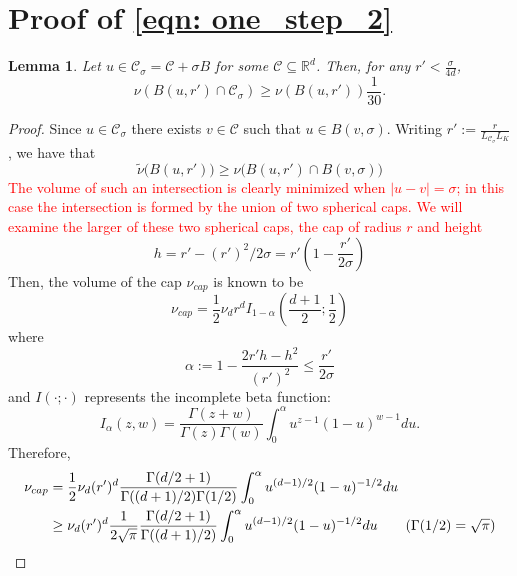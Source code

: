 \documentclass{article}
\newcommand{\Reals}{\mathbb{R}}
\newcommand{\abs}[1]{\left \lvert #1 \right \rvert}
\newcommand{\Cset}{\mathcal{C}}
\newcommand{\Csig}{\Cset_{\sigma}}
\newcommand{\1}{\mathbf{1}}
\theoremstyle{alden}
\theoremstyle{aldenthm}
\newtheorem{lemma}{Lemma}
\theoremstyle{remark}
\begin{document}
\section{Proof of \eqref{eqn: one_step_2}}
\begin{lemma}
	\label{lem: local_conductance}
	Let $u \in \Csig = \Cset + \sigma B$ for some $\Cset \subseteq \Reals^d$. Then, for any $r' < \frac{\sigma}{4d}$,
	\begin{equation*}
	\nu(B(u,r') \cap \Csig) \geq \nu(B(u,r'))\frac{1}{30}.
	\end{equation*}
\end{lemma}
\begin{proof}
	Since $u \in \Csig$ there exists $v \in \Cset$ such that $u \in B(v, \sigma)$. Writing $r' := \frac{r}{L_{\Csig} L_K}$, we have that
	\begin{equation*}
	\widetilde{\nu}\bigl(B(u, r')\bigr) \geq \nu\bigl(B(u, r') \cap B(v, \sigma)\bigr)
	\end{equation*}
	\textcolor{red}{The volume of such an intersection is clearly minimized when $\abs{u - v} = \sigma$; in this case the intersection is formed by the union of two spherical caps. We will examine the larger of these two spherical caps, the cap of radius $r$ and height}
	\begin{equation*}
	h = r' - (r')^2/2\sigma = r' \left( 1 - \frac{r'}{2 \sigma} \right)
	\end{equation*}	
	Then, the volume of the cap $\nu_{cap}$ is known to be
	\begin{equation*}
	\nu_{cap} = \frac{1}{2} \nu_d r^d I_{1 - \alpha}(\frac{d + 1}{2}; \frac{1}{2})
	\end{equation*}
	where
	\begin{equation*}
	\alpha := 1 - \frac{2 r' h - h^2}{(r')^2} \leq \frac{r'}{2 \sigma}
	\end{equation*}
	and $I(\cdot; \cdot)$ represents the incomplete beta function:
	\begin{equation*}
	I_{\alpha}(z,w) = \frac{\Gamma(z + w)}{\Gamma(z) \Gamma(w)} \int_{0}^{\alpha} u^{z - 1} (1 - u)^{w - 1} du.
	\end{equation*}
	Therefore,
	\begin{align*}
	\nu_{cap} & = \frac{1}{2} \nu_d (r')^d \frac{\Gamma(d/2 + 1)}{\Gamma((d+1)/2) \Gamma(1/2)} \int_{0}^{\alpha} u^{(d - 1)/2} (1 - u)^{-1/2} du \\
	& \geq \nu_d (r')^d \frac{1}{2 \sqrt{\pi} }  \frac{\Gamma(d/2 + 1)}{\Gamma((d+1)/2) } \int_{0}^{\alpha} u^{(d - 1)/2} (1 - u)^{-1/2} du \tag{$\Gamma(1/2) = \sqrt{\pi}$} \\ 

\end{align*}
\end{proof}
\end{document}
